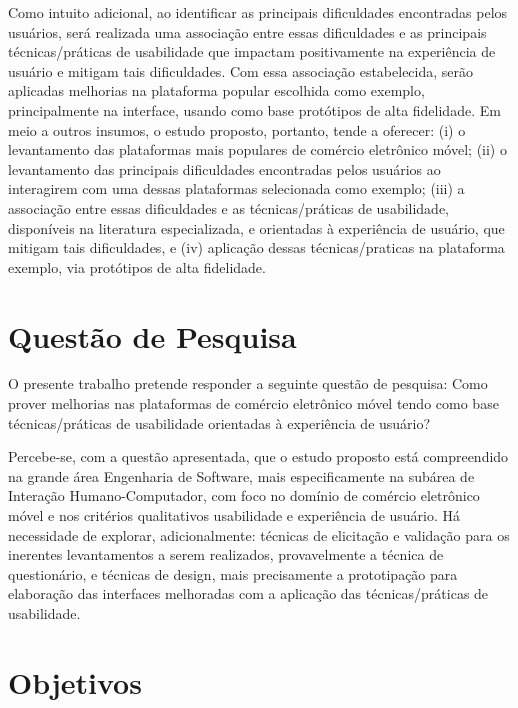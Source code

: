 Como intuito adicional, ao identificar as principais dificuldades encontradas pelos usuários, será realizada uma associação entre essas dificuldades e as principais técnicas/práticas de usabilidade que impactam positivamente na experiência de usuário e mitigam tais dificuldades. Com essa associação estabelecida, serão aplicadas melhorias na plataforma popular escolhida como exemplo, principalmente na interface, usando como base protótipos de alta fidelidade. Em meio a outros insumos, o estudo proposto, portanto, tende a oferecer: (i) o levantamento das plataformas mais populares de comércio eletrônico móvel; (ii) o levantamento das principais dificuldades encontradas pelos usuários ao interagirem com uma dessas plataformas selecionada como exemplo; (iii) a associação entre essas dificuldades e as técnicas/práticas de usabilidade, disponíveis na literatura especializada, e orientadas à experiência de usuário, que mitigam tais dificuldades, e (iv) aplicação dessas técnicas/praticas na plataforma exemplo, via protótipos de alta fidelidade.



\section{Questão de Pesquisa} 
    \label{questao}
    
O presente trabalho pretende responder a seguinte questão de pesquisa: Como prover melhorias nas plataformas de comércio eletrônico móvel tendo como base técnicas/práticas de usabilidade orientadas à experiência de usuário?

Percebe-se, com a questão apresentada, que o estudo proposto está compreendido na grande área Engenharia de Software, mais especificamente na subárea de Interação Humano-Computador, com foco no domínio de comércio eletrônico móvel e nos critérios qualitativos usabilidade e experiência de usuário. Há necessidade de explorar, adicionalmente: técnicas de elicitação e validação para os inerentes levantamentos a serem realizados, provavelmente a técnica de questionário, e técnicas de design, mais precisamente a prototipação para elaboração das interfaces melhoradas com a aplicação das técnicas/práticas de usabilidade.



\section{Objetivos} 
    \label{ob}
    
